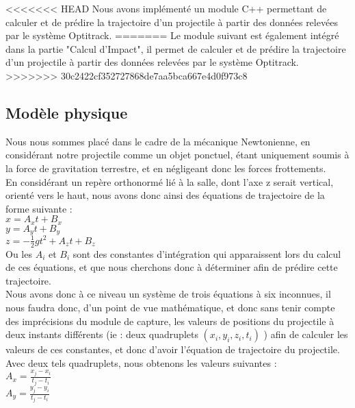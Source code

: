 <<<<<<< HEAD
Nous avons implémenté un module C++ permettant de calculer et de prédire la trajectoire d'un projectile à partir des données relevées par le système Optitrack.
=======
Le module suivant est également intégré dans la partie "Calcul d'Impact", il permet de calculer et de prédire la trajectoire d'un projectile à partir des données relevées par le système Optitrack.
>>>>>>> 30c2422cf352727868de7aa5bca667e4d0f973c8

\subsection{Modèle physique}

Nous nous sommes placé dans le cadre de la mécanique Newtonienne, en considérant notre projectile comme un objet ponctuel, étant uniquement soumis à la force de gravitation terrestre, et en négligeant donc les forces frottements.\\

En considérant un repère orthonormé lié à la salle, dont l'axe z serait vertical, orienté vers le haut, nous avons donc ainsi des équations de trajectoire de la forme suivante :\\

$x = A_xt + B_x$\\

$y = A_yt + B_y$\\

$z = -\frac{1}{2} g t^2 + A_zt + B_z$\\

Ou les $A_i$ et $B_i$ sont des constantes d'intégration qui apparaissent lors du calcul de ces équations, et que nous cherchons donc à déterminer afin de prédire cette trajectoire.\\

Nous avons donc à ce niveau un système de trois équations à six inconnues, il nous faudra donc, d'un point de vue mathématique, et donc sans tenir compte des imprécisions du module de capture, les valeurs de positions du projectile à deux instants différents (ie : deux quadruplets $(x_i, y_i, z_i, t_i)$ ) afin de calculer les valeurs de ces constantes, et donc d'avoir l'équation de trajectoire du projectile.
\newpage
Avec deux tels quadruplets, nous obtenons les valeurs suivantes :\\

$A_x = \frac{x_j-x_i}{t_j-t_i}$\\

$A_y = \frac{y_j-y_i}{t_j-t_i}$\\

